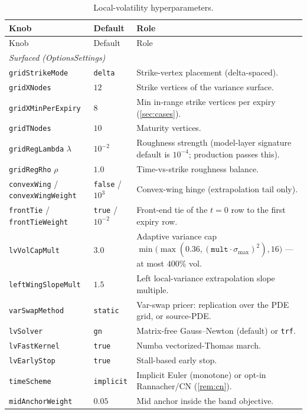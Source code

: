 \documentclass[11pt]{article}
\begin{document}
\begin{longtable}{p{}p{}p{}}
\caption{Local-volatility hyperparameters.}\label{tab:atlas}\\
\toprule Knob & Default & Role\\ \midrule
\endfirsthead \toprule Knob & Default & Role\\ \midrule \endhead
\multicolumn{3}{l}{\emph{Surfaced (OptionsSettings)}}\\ \midrule
\texttt{gridStrikeMode} & \texttt{delta} & Strike-vertex placement (delta-spaced).\\
\texttt{gridXNodes} & $12$ & Strike vertices of the variance surface.\\
\texttt{gridXMinPerExpiry} & $8$ & Min in-range strike vertices per expiry (\cref{sec:cases}).\\
\texttt{gridTNodes} & $10$ & Maturity vertices.\\
\texttt{gridRegLambda} $\lambda$ & $10^{-2}$ & Roughness strength (model-layer signature default is $10^{-4}$; production passes this).\\
\texttt{gridRegRho} $\rho$ & $1.0$ & Time-vs-strike roughness balance.\\
\texttt{convexWing} / \texttt{convexWingWeight} & \texttt{false} / $10^{3}$ & Convex-wing hinge (extrapolation tail only).\\
\texttt{frontTie} / \texttt{frontTieWeight} & \texttt{true} / $10^{-2}$ & Front-end tie of the $t=0$ row to the first expiry row.\\
\texttt{lvVolCapMult} & $3.0$ & Adaptive variance cap $\min\!\big(\max(0.36,(\texttt{mult}\cdot\sigma_{\max})^2),16\big)$ --- at most $400\%$ vol.\\
\texttt{leftWingSlopeMult} & $1.5$ & Left local-variance extrapolation slope multiple.\\
\texttt{varSwapMethod} & \texttt{static} & Var-swap pricer: replication over the PDE grid, or source-PDE.\\
\texttt{lvSolver} & \texttt{gn} & Matrix-free Gauss--Newton (default) or \texttt{trf}.\\
\texttt{lvFastKernel} & \texttt{true} & Numba vectorized-Thomas march.\\
\texttt{lvEarlyStop} & \texttt{true} & Stall-based early stop.\\
\texttt{timeScheme} & \texttt{implicit} & Implicit Euler (monotone) or opt-in Rannacher/CN (\cref{rem:cn}).\\
\texttt{midAnchorWeight} & $0.05$ & Mid anchor inside the band objective.\\

\end{longtable}
\end{document}

